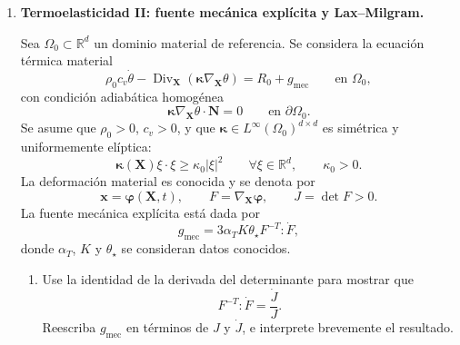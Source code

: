\documentclass[11pt]{article}
\newcommand{\R}{\mathbb{R}}
\DeclareMathOperator{\Div}{Div}
\begin{document}
\begin{enumerate}[label=\textbf{\arabic*.}, leftmargin=*]
\begin{enumerate}[label=(\alph*), leftmargin=*]
    \item Deduzca la estimaci\'on de estabilidad
    \begin{equation*}
        \|\bm v\|_{H^1(\Omega)}+\|p\|_{L^2(\Omega)}
        \le C\|F\|_{V'}.
    \end{equation*}

    \item Explique por qu\'e el caso $\alpha=0$ sigue estando cubierto, pero el l\'imite puramente Darcy $\mu=0$ no queda cubierto por esta formulaci\'on en $H^1_0(\Omega)^d$.
\end{enumerate}

\item \textbf{Termoelasticidad II: fuente mec\'anica expl\'icita y Lax--Milgram.}

Sea $\Omega_0\subset\R^d$ un dominio material de referencia. Se considera la ecuaci\'on t\'ermica material
\begin{equation*}
    \rho_0c_v\dot\theta-
    \Div_{\bm X}\left(\bm\kappa\nabla_{\bm X}\theta\right)
    =R_0+g_{\mathrm{mec}}
    \qquad\text{en }\Omega_0,
\end{equation*}
con condici\'on adiab\'atica homog\'enea
\begin{equation*}
    \bm\kappa\nabla_{\bm X}\theta\cdot\bm N=0
    \qquad\text{en }\partial\Omega_0.
\end{equation*}
Se asume que $\rho_0>0$, $c_v>0$, y que $\bm\kappa\in L^\infty(\Omega_0)^{d\times d}$ es sim\'etrica y uniformemente el\'iptica:
\begin{equation*}
    \bm\kappa(\bm X)\xi\cdot\xi\ge\kappa_0|\xi|^2
    \qquad\forall \xi\in\R^d,
    \qquad
    \kappa_0>0.
\end{equation*}
La deformaci\'on material es conocida y se denota por
\begin{equation*}
    \bm x=\bm\varphi(\bm X,t),
    \qquad
    F=\nabla_{\bm X}\bm\varphi,
    \qquad
    J=\det F>0.
\end{equation*}
La fuente mec\'anica expl\'icita est\'a dada por
\begin{equation*}
    g_{\mathrm{mec}}
    =3\alpha_TK\theta_\star F^{-T}:\dot F,
\end{equation*}
donde $\alpha_T$, $K$ y $\theta_\star$ se consideran datos conocidos.

\begin{enumerate}[label=(\alph*), leftmargin=*]
    \item Use la identidad de la derivada del determinante para mostrar que
    \begin{equation*}
        F^{-T}:\dot F=\frac{\dot J}{J}.
    \end{equation*}
    Reescriba $g_{\mathrm{mec}}$ en t\'erminos de $J$ y $\dot J$, e interprete brevemente el resultado.


\end{enumerate}
\end{enumerate}
\end{document}
